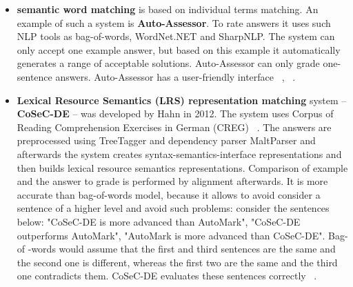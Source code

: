 \begin{itemize}
\begin{itemize}
\end{itemize}
\item \textbf{semantic word matching} is based on individual terms matching. An example of such a system is \textbf{Auto-Assessor}. To rate answers it uses such NLP tools as bag-of-words, WordNet.NET and SharpNLP. The system can only accept one example answer, but based on this example it automatically generates a range of acceptable solutions. Auto-Assessor can only grade one-sentence answers. Auto-Assessor has a user-friendly interface ~\cite{Burrows}, ~\cite{Hasanah}. 
\item \textbf{Lexical Resource Semantics (LRS) representation matching} system -- \textbf{CoSeC-DE} -- was developed by Hahn in 2012. The system uses Corpus of Reading Comprehension Exercises in German (CREG) ~\cite{CREG}. The answers are preprocessed using TreeTagger and dependency parser MaltParser and afterwards the system creates syntax-semantics-interface representations and then builds lexical resource semantics representations. Comparison of example and the answer to grade is performed by alignment afterwards. It is more accurate than bag-of-words model, because it allows to avoid consider a sentence of a higher level and avoid such problems: consider the sentences below: "CoSeC-DE is more advanced than AutoMark", "CoSeC-DE outperforms AutoMark", "AutoMark is more advanced than CoSeC-DE". Bag-of -words would assume that the first and third sentences are the same and the second one is different, whereas the first two are the same and the third one contradicts them. CoSeC-DE evaluates these sentences correctly  ~\cite{Hahn}.
\end{itemize}



